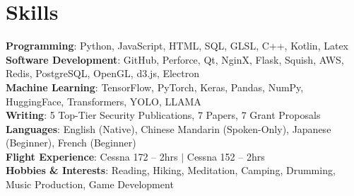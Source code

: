 \section{Skills}
 \begin{itemize}[leftmargin=0.5cm, label={}]
    \small{\item{
     \textbf{Programming}{: Python, JavaScript, HTML, SQL, GLSL, C++, Kotlin, Latex} \\\vspace{1pt}
     \textbf{Software Development}{: GitHub, Perforce, Qt, NginX, Flask, Squish, AWS, Redis, PostgreSQL, OpenGL, d3.js, Electron} \\\vspace{1pt}
     \textbf{Machine Learning}{: TensorFlow, PyTorch, Keras, Pandas, NumPy, HuggingFace, Transformers, YOLO, LLAMA} \\\vspace{1pt}
     \textbf{Writing}{: 5 Top-Tier Security Publications, 7 Papers, 7 Grant Proposals} \\\vspace{1pt}
     \textbf{Languages}{: English (Native), Chinese Mandarin (Spoken-Only), Japanese (Beginner), French (Beginner)} \\\vspace{1pt}
     \textbf{Flight Experience}{: Cessna 172 -- 2hrs $|$ Cessna 152 -- 2hrs} \\\vspace{1pt}
     \textbf{Hobbies \& Interests}{: Reading, Hiking, Meditation, Camping, Drumming, Music Production, Game Development} \\\vspace{1pt}
    }}
 \end{itemize}